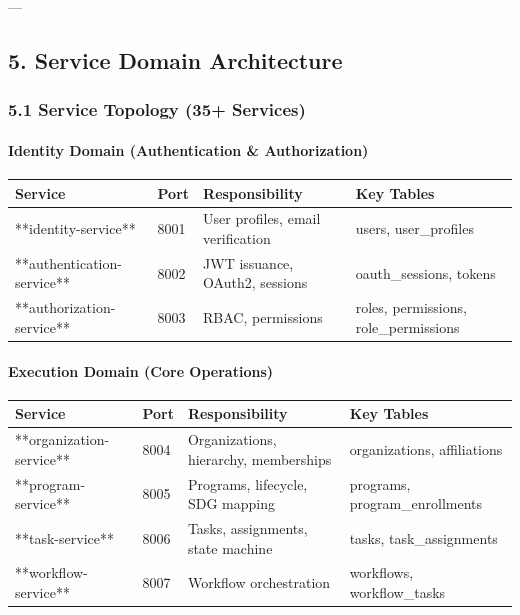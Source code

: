 \documentclass[11pt,a4paper]{article}
\begin{document}
---

\subsection{5. Service Domain Architecture}

\subsubsection{5.1 Service Topology (35+ Services)}

\paragraph{Identity Domain (Authentication & Authorization)}

\begin{table}[H]
\centering
\begin{tabular}{|l|l|l|l|}
\hline
Service & Port & Responsibility & Key Tables \\
\hline
**identity-service** & 8001 & User profiles, email verification & users, user_profiles \\
\hline
**authentication-service** & 8002 & JWT issuance, OAuth2, sessions & oauth_sessions, tokens \\
\hline
**authorization-service** & 8003 & RBAC, permissions & roles, permissions, role_permissions \\
\hline
\end{tabular}
\end{table}

\paragraph{Execution Domain (Core Operations)}

\begin{table}[H]
\centering
\begin{tabular}{|l|l|l|l|}
\hline
Service & Port & Responsibility & Key Tables \\
\hline
**organization-service** & 8004 & Organizations, hierarchy, memberships & organizations, affiliations \\
\hline
**program-service** & 8005 & Programs, lifecycle, SDG mapping & programs, program_enrollments \\
\hline
**task-service** & 8006 & Tasks, assignments, state machine & tasks, task_assignments \\
\hline
**workflow-service** & 8007 & Workflow orchestration & workflows, workflow_tasks \\
\hline
\end{tabular}
\end{table}
\end{document}

